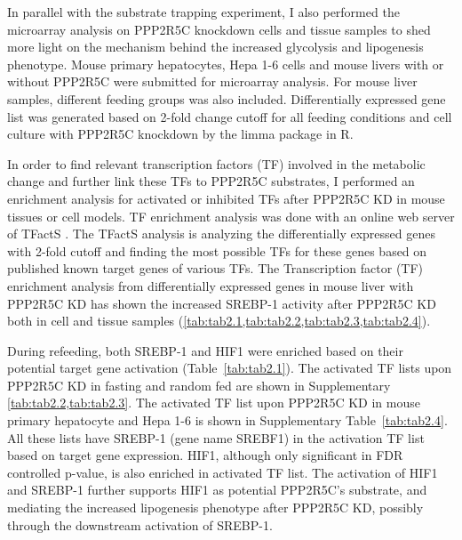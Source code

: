 In parallel with the substrate trapping experiment,  I also performed the microarray analysis on PPP2R5C knockdown cells and tissue samples to shed more light on the mechanism behind the increased glycolysis and lipogenesis phenotype. Mouse primary hepatocytes, Hepa 1-6 cells and mouse livers with or without PPP2R5C were submitted for microarray analysis. For mouse liver samples, different feeding groups was also included. Differentially expressed gene list was generated based on 2-fold change cutoff for all feeding conditions and cell culture with PPP2R5C knockdown by the limma package in R. 

In order to find relevant transcription factors (TF) involved in the metabolic change and further link these TFs to PPP2R5C substrates, I performed an enrichment analysis for activated or inhibited TFs after PPP2R5C KD in mouse tissues or cell models. TF enrichment analysis was done with an online web server of TFactS \cite{essaghir_transcription_2010}. The TFactS analysis is analyzing the differentially expressed genes with 2-fold cutoff and finding the most possible TFs for these genes based on published known target genes of various TFs. The Transcription factor (TF) enrichment analysis from differentially expressed genes in mouse liver with PPP2R5C KD has shown the increased SREBP-1 activity after PPP2R5C KD both in cell and tissue samples (\cref{tab:tab2.1,tab:tab2.2,tab:tab2.3,tab:tab2.4}).

During refeeding, both SREBP-1 and HIF1\textalpha{} were enriched based on their potential target gene activation (Table~\ref{tab:tab2.1}). The activated TF lists upon PPP2R5C KD in fasting and random fed are shown in Supplementary \cref{tab:tab2.2,tab:tab2.3}. The activated TF list upon PPP2R5C KD in mouse primary hepatocyte and Hepa 1-6 is shown in Supplementary Table~\ref{tab:tab2.4}. All these lists have SREBP-1 (gene name SREBF1) in the activation TF list based on target gene expression. HIF1\textalpha{}, although only significant in FDR controlled p-value, is also enriched in activated TF list. The activation of HIF1\textalpha{} and SREBP-1 further supports HIF1\textalpha{} as potential PPP2R5C's substrate, and mediating the increased lipogenesis phenotype after PPP2R5C KD, possibly through the downstream activation of SREBP-1. 

